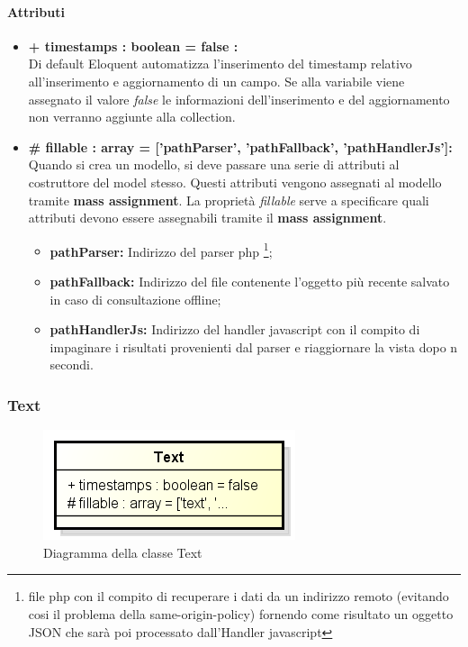 	\paragraph{Attributi}
	\begin{itemize}
		\item \textbf{+ timestamps : boolean = false :}\\
		Di default Eloquent automatizza l'inserimento del timestamp relativo all'inserimento e aggiornamento di un campo. Se alla variabile viene assegnato il valore \textit{false} le informazioni dell'inserimento e del aggiornamento non verranno aggiunte alla collection.
		\item \textbf{\# fillable : array = ['pathParser’, ’pathFallback’, ’pathHandlerJs']:}\\
		Quando si crea un modello, si deve passare una serie di attributi al costruttore del model stesso. Questi attributi vengono assegnati al modello tramite \textbf{mass assignment}. La proprietà \textit{fillable} serve a specificare quali attributi devono essere assegnabili tramite il \textbf{mass assignment}.
		\begin{itemize}
			\item \textbf{pathParser:} Indirizzo del parser php \footnote{file php con il compito di recuperare i dati da un indirizzo remoto (evitando cosi il problema della same-origin-policy) fornendo come risultato un oggetto JSON che sarà poi processato dall'Handler javascript};
			\item \textbf{pathFallback:} Indirizzo del file contenente l'oggetto più recente salvato in caso di consultazione offline;
			\item \textbf{pathHandlerJs:} Indirizzo del handler javascript con il compito di impaginare i risultati provenienti dal parser e riaggiornare la vista dopo n secondi.
		\end{itemize}
	\end{itemize}
\newpage


\subsubsection{Text}

	\begin{figure}[h]
		\centering
		\includegraphics[width=0.5\linewidth]{img/back_end_premi_model_text}
		\caption[Diagramma della classe Text]{Diagramma della classe Text}
		\label{fig:back_end_premi_model_text}
	\end{figure}


